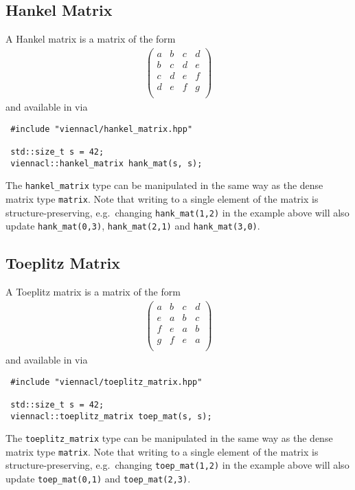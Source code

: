 \subsection{Hankel Matrix}
A Hankel matrix is a matrix of the form
\begin{align*}
 \left( \begin{array}{cccc}
         a & b & c & d \\
         b & c & d & e \\
         c & d & e & f \\
         d & e & f & g \\
        \end{array} \right)
\end{align*}
and available in {\ViennaCL} via
\begin{lstlisting}
 #include "viennacl/hankel_matrix.hpp"

 std::size_t s = 42;
 viennacl::hankel_matrix hank_mat(s, s);
\end{lstlisting}
The \lstinline|hankel_matrix| type can be manipulated in the same way as the dense matrix type \lstinline|matrix|. Note that writing to a single element of
the matrix is structure-preserving, e.g.~changing \lstinline|hank_mat(1,2)| in the example above will also update \lstinline|hank_mat(0,3)|,
\lstinline|hank_mat(2,1)| and
\lstinline|hank_mat(3,0)|.

\subsection{Toeplitz Matrix}
A Toeplitz matrix is a matrix of the form
\begin{align*}
 \left( \begin{array}{cccc}
         a & b & c & d \\
         e & a & b & c \\
         f & e & a & b \\
         g & f & e & a \\
        \end{array} \right)
\end{align*}
and available in {\ViennaCL} via
\begin{lstlisting}
 #include "viennacl/toeplitz_matrix.hpp"

 std::size_t s = 42;
 viennacl::toeplitz_matrix toep_mat(s, s);
\end{lstlisting}
The \lstinline|toeplitz_matrix| type can be manipulated in the same way as the dense matrix type \lstinline|matrix|. Note that writing to a single element of
the matrix is structure-preserving, e.g.~changing \lstinline|toep_mat(1,2)| in the example above will also update \lstinline|toep_mat(0,1)| and
\lstinline|toep_mat(2,3)|.


